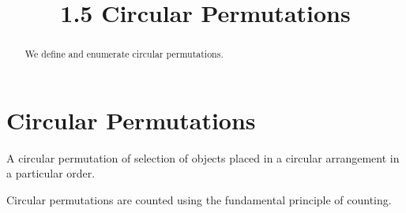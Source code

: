 \documentclass[handout]{ximera}
\title{1.5 Circular Permutations}
\begin{document}
\begin{abstract}
We define and enumerate circular permutations.
\end{abstract}

\maketitle

\section{Circular Permutations}



\begin{definition}
A circular permutation of selection of objects placed in a circular arrangement in a particular order.
\end{definition}

Circular permutations are counted using the fundamental principle of counting.
\end{document}
